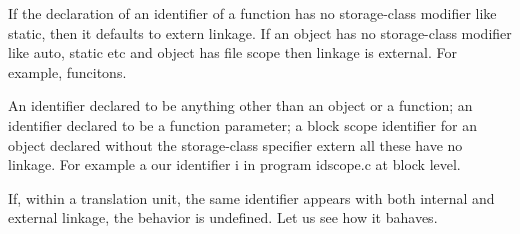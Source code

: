 If the declaration of an identifier of a function has no storage-class
modifier like static, then it defaults to extern linkage. If an
object has no storage-class modifier like auto, static etc and object
has file scope then linkage is external. For example, funcitons.

An identifier declared to be anything other than an object or a
function; an identifier declared to be a function parameter; a block
scope identifier for an object declared without the storage-class
specifier extern all these have no linkage. For example a our
identifier i in program idscope.c at block level.

If, within a translation unit, the same identifier appears with both
internal and external linkage, the behavior is undefined. Let us see
how it bahaves.
